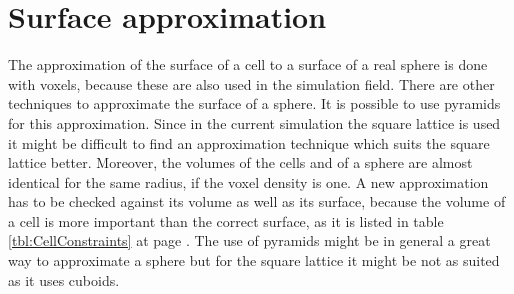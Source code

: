 \newpage
\section{Surface approximation}
The approximation of the surface of a cell to a surface of a real sphere is done with voxels, because these are also used in the simulation field. There are other techniques to approximate the surface of a sphere. It is possible to use pyramids for this approximation. Since in the current simulation the square lattice is used it might be difficult to find an approximation technique which suits the square lattice better. Moreover, the volumes of the cells and of a sphere are almost identical for the same radius, if the voxel density is one. A new approximation has to be checked against its volume as well as its surface, because the volume of a cell is more important than the correct surface, as it is listed in table \ref{tbl:CellConstraints} at page \pageref{tbl:CellConstraints}. The use of pyramids might be in general a great way to approximate a sphere but for the square lattice it might be not as suited as it uses cuboids.

